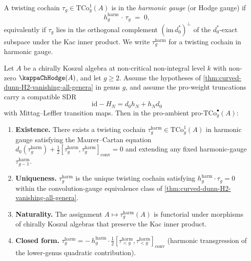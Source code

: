 \begin{definition}
\label{def:harmonic-gauge}
A twisting cochain
\(\tau_{g} \in \mathrm{TCo}^{1}_{g}(A)\) is in the
\emph{harmonic gauge} (or Hodge gauge) if
\[
 h^{\mathrm{harm}}_{g}\,\cdot\,\tau_{g} \;=\; 0,
\]
equivalently if \(\tau_{g}\) lies in the orthogonal complement
\((\mathrm{im}\, d_{0}^{\ast})^{\perp}\) of the \(d_{0}^{\ast}\)-exact
subspace under the Kac inner product. We write
\(\tau_{g}^{\mathrm{harm}}\) for a twisting cochain in harmonic
gauge.
\end{definition}

\begin{theorem}
\label{thm:harmonic-gauge-existence-uniqueness}
\ClaimStatusConditional
Let \(A\) be a chirally Koszul algebra at non-critical non-integral
level \(k\) with non-zero \(\kappaChHodge(A)\), and let \(g \ge 2\).
Assume the hypotheses of
\autoref{thm:curved-dunn-H2-vanishing-all-genera} in genus \(g\),
and assume the pro-weight truncations carry a compatible SDR
\[
\mathrm{id}-H_{N}=d_{0}h_{N}+h_{N}d_{0}
\]
with Mittag--Leffler transition maps. Then in the pro-ambient
\(\mathrm{pro}\text{-}\mathrm{TCo}^{\bullet}_{g}(A)\):
\begin{enumerate}
 \item \textbf{Existence.} There exists a twisting cochain
 \(\tau_{g}^{\mathrm{harm}} \in \mathrm{TCo}^{1}_{g}(A)\) in
 harmonic gauge satisfying the Maurer--Cartan equation
 \(d_{0}(\tau_{g}^{\mathrm{harm}})
 + \tfrac{1}{2}[\tau_{g}^{\mathrm{harm}},
 \tau_{g}^{\mathrm{harm}}]_{\mathrm{conv}} = 0\) and extending
 any fixed harmonic-gauge \(\tau_{g-1}^{\mathrm{harm}}\).
 \item \textbf{Uniqueness.} \(\tau_{g}^{\mathrm{harm}}\) is the
 unique twisting cochain satisfying
 \(h^{\mathrm{harm}}_{g} \cdot \tau_{g} = 0\) within the
 convolution-gauge equivalence class of
 \autoref{thm:curved-dunn-H2-vanishing-all-genera}.
 \item \textbf{Naturality.} The assignment
 \(A \mapsto \tau_{g}^{\mathrm{harm}}(A)\) is functorial under
 morphisms of chirally Koszul algebras that preserve the Kac
 inner product.
 \item \textbf{Closed form.}
 \(\tau_{g}^{\mathrm{harm}}
 = -\,h^{\mathrm{harm}}_{g}
 \cdot \tfrac{1}{2}[\tau_{<g}^{\mathrm{harm}},
 \tau_{<g}^{\mathrm{harm}}]_{\mathrm{conv}}\)
 (harmonic transgression of the lower-genus quadratic
 contribution).
\end{enumerate}
\end{theorem}

